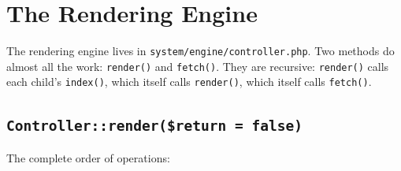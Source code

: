 \documentclass[11pt,a4paper]{article}
\begin{document}
\section{The Rendering Engine}\label{sec:engine}

The rendering engine lives in \texttt{system/engine/controller.php}.
Two methods do almost all the work: \texttt{render()} and
\texttt{fetch()}. They are recursive: \texttt{render()} calls
each child's \texttt{index()}, which itself calls
\texttt{render()}, which itself calls \texttt{fetch()}.

\subsection{\texttt{Controller::render(\$return = false)}}

The complete order of operations:
\end{document}
